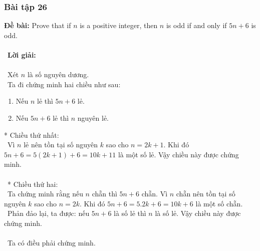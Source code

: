 \documentclass[a4paper]{article}
\begin{document}
\subsubsection{Bài tập 26}
\textbf{Đề bài: } Prove that if $n$ is a positive integer, then $n$ is odd if and only if $5n + 6$ is odd.\\\ \\\
\textbf{Lời giải:} \\\ \\\
Xét $n$ là số nguyên dương. \\\
Ta đi chứng minh hai chiều như sau:
\begin{enumerate}
\item Nếu $n$ lẻ thì $5n+6$ lẻ.
\item Nếu $5n+6$ lẻ thì $n$ nguyên lẻ.
\end{enumerate}
* Chiều thứ nhất: \\\
Vì $n$ lẻ nên tồn tại số nguyên $k$ sao cho $n=2k+1$. Khi đó $5n+6=5(2k+1)+6=10k+11$ là một số lẻ. Vậy chiều này được chứng minh. \\\ \\\
* Chiều thứ hai: \\\
Ta chứng minh rằng nếu $n$ chẵn thì $5n+6$ chẵn. Vì $n$ chẵn nên tồn tại số nguyên $k$ sao cho $n=2k$. Khi đó $5n+6=5.2k+6=10k+6$ là một số chẵn. \\\
Phản đảo lại, ta được: nếu $5n+6$ là số lẻ thì $n$ là số lẻ. Vậy chiều này được chứng minh. \\\ \\\
Ta có điều phải chứng minh.

\clearpage
\end{document}
